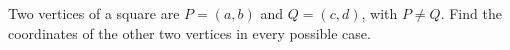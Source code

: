 Two vertices of a square are $P=(a,b)$ and $Q=(c,d)$, with $P\ne Q$. Find the coordinates of the other two vertices in every possible case.
